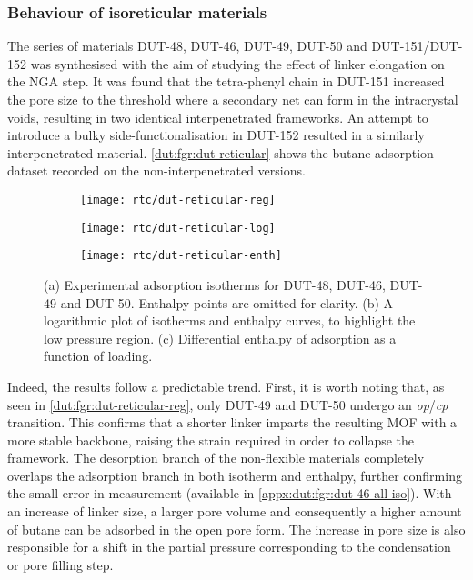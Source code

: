 \subsubsection{Behaviour of isoreticular materials}

The series of materials DUT-48, DUT-46, DUT-49, DUT-50 and DUT-151/DUT-152
was synthesised with the aim of studying the effect of linker 
elongation on the NGA step. It was found that the tetra-phenyl chain
in DUT-151 increased the pore size to the threshold 
where a secondary net can form in the intracrystal voids, resulting 
in two identical interpenetrated frameworks. An attempt to introduce 
a bulky side-functionalisation in DUT-152 resulted in a similarly
interpenetrated material. \autoref{dut:fgr:dut-reticular} shows the
butane adsorption dataset recorded on the non-interpenetrated versions.

\begin{figure}[htb]
    \centering
    \begin{subfigure}{0.33\linewidth}
        \texttt{[image: rtc/dut-reticular-reg]}%
        \caption{}\label{dut:fgr:dut-reticular-reg}
    \end{subfigure}%
    \begin{subfigure}{0.33\linewidth}
        \texttt{[image: rtc/dut-reticular-log]}%
        \caption{}\label{dut:fgr:dut-reticular-log}
    \end{subfigure}%
    \begin{subfigure}{0.33\linewidth}
        \texttt{[image: rtc/dut-reticular-enth]}%
        \caption{}\label{dut:fgr:dut-reticular-enth}
    \end{subfigure}%
    \caption{(a) Experimental adsorption isotherms for DUT-48, DUT-46, DUT-49 and 
    DUT-50. Enthalpy points are omitted for clarity. (b) A logarithmic plot of 
    isotherms and enthalpy curves, to highlight the low pressure region. 
    (c) Differential enthalpy of adsorption as a function of loading.}%
    \label{dut:fgr:dut-reticular}
\end{figure}


Indeed, the results follow a predictable trend. First, it is worth 
noting that, as seen in \autoref{dut:fgr:dut-reticular-reg}, only DUT-49 
and DUT-50 undergo an \textit{op}/\textit{cp} transition. This confirms that 
a shorter linker imparts the resulting MOF with a more stable backbone,
raising the strain required in order to collapse the framework.
The desorption branch of the non-flexible materials completely 
overlaps the adsorption branch in both isotherm and enthalpy, further
confirming the small error in measurement (available in 
\autoref{appx:dut:fgr:dut-46-all-iso}).
With an increase of linker size, a larger pore volume and consequently
a higher amount of butane can be adsorbed in the open pore form. 
The increase in pore size is also responsible for a shift in the 
partial pressure corresponding to the condensation or pore filling step.

